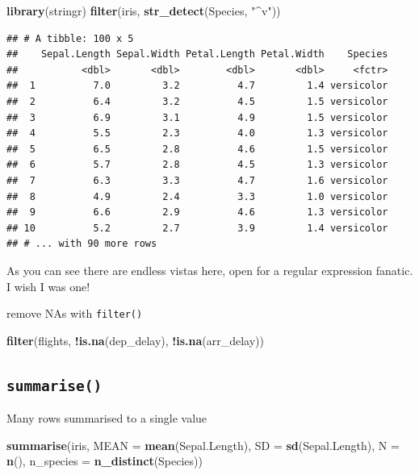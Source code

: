 \documentclass[]{book}
\newenvironment{Shaded}{\begin{snugshade}}{\end{snugshade}}
\newcommand{\KeywordTok}[1]{\textcolor[rgb]{0.13,0.29,0.53}{\textbf{#1}}}
\newcommand{\DataTypeTok}[1]{\textcolor[rgb]{0.13,0.29,0.53}{#1}}
\newcommand{\StringTok}[1]{\textcolor[rgb]{0.31,0.60,0.02}{#1}}
\newcommand{\OperatorTok}[1]{\textcolor[rgb]{0.81,0.36,0.00}{\textbf{#1}}}
\newcommand{\NormalTok}[1]{#1}
\begin{document}
\begin{Shaded}
\begin{Highlighting}[]
\KeywordTok{library}\NormalTok{(stringr)}
\KeywordTok{filter}\NormalTok{(iris, }\KeywordTok{str_detect}\NormalTok{(Species, }\StringTok{"^v"}\NormalTok{)) }
\end{Highlighting}
\end{Shaded}

\begin{verbatim}
## # A tibble: 100 x 5
##    Sepal.Length Sepal.Width Petal.Length Petal.Width    Species
##           <dbl>       <dbl>        <dbl>       <dbl>     <fctr>
##  1          7.0         3.2          4.7         1.4 versicolor
##  2          6.4         3.2          4.5         1.5 versicolor
##  3          6.9         3.1          4.9         1.5 versicolor
##  4          5.5         2.3          4.0         1.3 versicolor
##  5          6.5         2.8          4.6         1.5 versicolor
##  6          5.7         2.8          4.5         1.3 versicolor
##  7          6.3         3.3          4.7         1.6 versicolor
##  8          4.9         2.4          3.3         1.0 versicolor
##  9          6.6         2.9          4.6         1.3 versicolor
## 10          5.2         2.7          3.9         1.4 versicolor
## # ... with 90 more rows
\end{verbatim}

As you can see there are endless vistas here, open for a regular
expression fanatic. I wish I was one!

remove NAs with \texttt{filter()}

\begin{Shaded}
\begin{Highlighting}[]
\KeywordTok{filter}\NormalTok{(flights, }\OperatorTok{!}\KeywordTok{is.na}\NormalTok{(dep_delay), }\OperatorTok{!}\KeywordTok{is.na}\NormalTok{(arr_delay))}
\end{Highlighting}
\end{Shaded}

\subsection{\texorpdfstring{\texttt{summarise()}}{summarise()}}\label{summarise}

Many rows summarised to a single value

\begin{Shaded}
\begin{Highlighting}[]
\KeywordTok{summarise}\NormalTok{(iris, }
          \DataTypeTok{MEAN =} \KeywordTok{mean}\NormalTok{(Sepal.Length), }
          \DataTypeTok{SD =} \KeywordTok{sd}\NormalTok{(Sepal.Length), }
          \DataTypeTok{N =} \KeywordTok{n}\NormalTok{(), }
          \DataTypeTok{n_species =} \KeywordTok{n_distinct}\NormalTok{(Species))}
\end{Highlighting}
\end{Shaded}
\end{document}
